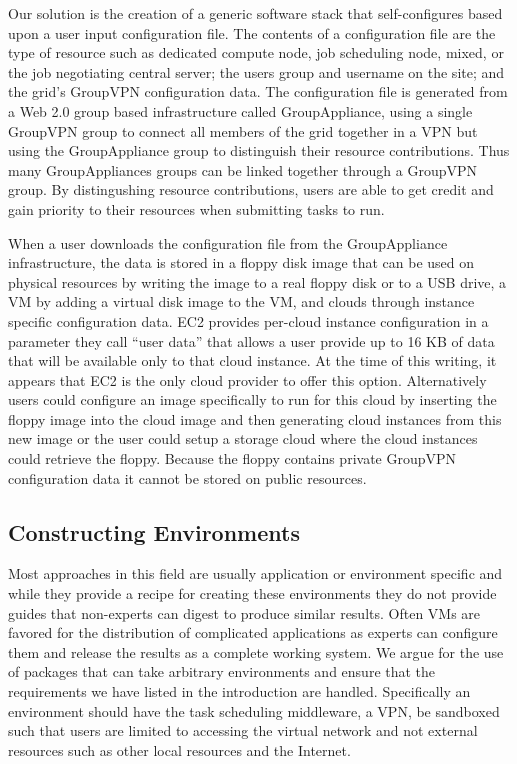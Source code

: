 \documentclass{sig-alternate}
\begin{document}
Our solution is the creation of a generic software stack that self-configures
based upon a user input configuration file.  The contents of a configuration
file are the type of resource such as dedicated compute node, job scheduling
node, mixed, or the job negotiating central server; the users group and
username on the site; and the grid's GroupVPN configuration data.  The
configuration file is generated from a Web 2.0 group based infrastructure
called GroupAppliance, using a single GroupVPN group to connect all members of
the grid together in a VPN but using the GroupAppliance group to distinguish
their resource contributions.  Thus many GroupAppliances groups can be linked
together through a GroupVPN group.  By distingushing resource contributions,
users are able to get credit and gain priority to their resources when
submitting tasks to run.

When a user downloads the configuration file from the GroupAppliance
infrastructure, the data is stored in a floppy disk image that can be used on
physical resources by writing the image to a real floppy disk or to a USB drive,
a VM by adding a virtual disk image to the VM, and clouds through instance
specific configuration data.  EC2 provides per-cloud instance configuration in a
parameter they call ``user data'' that allows a user provide up to 16 KB of data
that will be available only to that cloud instance.  At the time of this
writing, it appears that EC2 is the only cloud provider to offer this option.
Alternatively users could configure an image specifically to run for this
cloud by inserting the floppy image into the cloud image and then generating
cloud instances from this new image or the user could setup a storage cloud
where the cloud instances could retrieve the floppy.  Because the floppy
contains private GroupVPN configuration data it cannot be stored on public
resources.

\subsection{Constructing Environments}
Most approaches in this field are usually application or environment specific
and while they provide a recipe for creating these environments they do not
provide guides that non-experts can digest to produce similar results.  Often
VMs are favored for the distribution of complicated applications as experts can
configure them and release the results as a complete working system.  We argue
for the use of packages that can take arbitrary environments and ensure that
the requirements we have listed in the introduction are handled.  Specifically
an environment should have the task scheduling middleware, a VPN, be sandboxed
such that users are limited to accessing the virtual network and not external
resources such as other local resources and the Internet.
\end{document}
